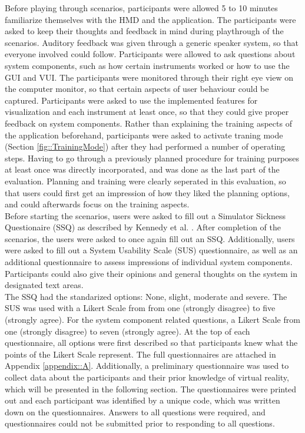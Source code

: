 Before playing through scenarios, participants were allowed 5 to 10 minutes familiarize themselves with the HMD and the application.
The participants were asked to keep their thoughts and feedback in mind during playthrough of the scenarios.
Auditory feedback was given through a generic speaker system, so that everyone involved could follow.
Participants were allowed to ask questions about system components, such as how certain instruments worked or how to use the GUI and VUI.
The participants were monitored through their right eye view on the computer monitor, so that certain aspects of user behaviour could be captured.
Participants were asked to use the implemented features for visualization and each instrument at least once, so that they could give proper feedback on system components.
Rather than explaining the training aspects of the application beforehand, participants were asked to activate traning mode (Section \ref{fig::TrainingMode}) after they had performed a number 
of operating steps.
Having to go through a previously planned procedure for training purposes at least once was directly incorporated, and was done as the last part of the evaluation.
Planning and training were clearly seperated in this evaluation, so that users could first get an impression of how they liked the planning options, and could afterwards focus on the training aspects.
\\ Before starting the scenarios, users were asked to fill out a Simulator Sickness Questionaire (SSQ) as described by Kennedy et al. \cite{kennedy1993simulator}.
After completion of the scenarios, the users were asked to once again fill out an SSQ.
Additionally, users were asked to fill out a System Usability Scale (SUS) \cite{brooke1996sus} questionnaire, as well as an additional questionnaire to assess impressions of individual system components.
Participants could also give their opinions and general thoughts on the system in designated text areas.
\\ The SSQ had the standarized options: None, slight, moderate and severe.
The SUS was used with a Likert Scale from from one (strongly disagree) to five (strongly agree).
For the system component related questions, a Likert Scale from one (strongly disagree) to seven (strongly agree).
At the top of each questionnaire, all options were first described so that participants knew what the points of the Likert Scale represent.
The full questionnaires are attached in Appendix \ref{appendix::A}.
Additionally, a preliminary questionnaire was used to collect data about the participants and their prior knowledge of virtual reality, which will be presented in the following section.
The questionnaires were printed out and each participant was identified by a unique code, which was written down on the questionnaires.
Answers to all questions were required, and questionnaires could not be submitted prior to responding to all questions.